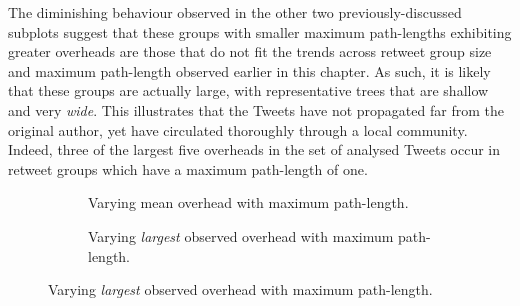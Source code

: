 The diminishing behaviour observed in the other two previously-discussed subplots suggest that these groups with smaller maximum path-lengths exhibiting greater overheads are those that do not fit the trends across retweet group size and maximum path-length observed earlier in this chapter. As such, it is likely that these groups are actually large, with representative trees that are shallow and very \textit{wide}. This illustrates that the Tweets have not propagated far from the original author, yet have circulated thoroughly through a local community. Indeed, three of the largest five overheads in the set of analysed Tweets occur in retweet groups which have a maximum path-length of one. 


\begin{figure}[h]
\begin{subfigure}{.5\textwidth}
    \centering
    \caption{Varying mean overhead with maximum path-length.}
    \label{fig:pathlength-meanoverhead}
\end{subfigure}
\quad
\begin{subfigure}{.5\textwidth}
    \centering
    \caption{Varying \textit{largest} observed overhead with maximum path-length.}
    \label{fig:pathlength-largestoverhead}
\end{subfigure}


\end{figure}

